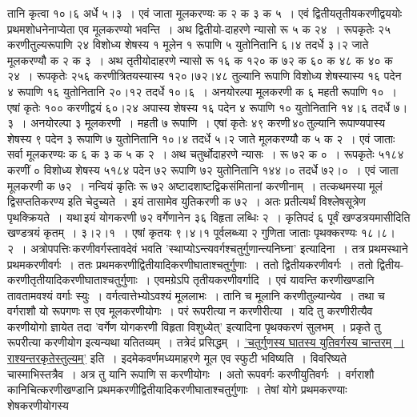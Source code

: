 \documentclass[11pt, openany]{book}
\begin{document}
\newpage

\begin{sloppypar}
\noindent तानि कृत्वा १०।६ अर्धे ५।३~। एवं जाता मूलकरण्यः क २ क ३ क ५~। एवं द्वितीयतृतीयकरणीद्वययोः प्रथमशोधनेनाप्येता एव मूलकरण्यो भवन्ति~। अथ द्वितीयो-दाहरणे न्यासो रू ५ क २४~। रूपकृतेः २५ करणीतुल्यरूपाणि २४ विशोध्य शेषस्य १ मूलेन १ रूपाणि ५ युतोनितानि ६।४ तदर्धे ३।२ जाते मूलकरण्यौ क २ क ३~। अथ तृतीयोदाहरणे न्यासो रू १६ क १२० क ७२ क ६० क ४८ क ४० क २४~। रूपकृतेः २५६ करणीत्रितयस्यास्य १२०।७२।४८ तुल्यानि रूपाणि विशोध्य शेषस्यास्य १६ पदेन ४ रूपाणि १६ युतोनितानि २०।१२ तदर्धे १०।६~। अनयोरल्पा मूलकरणी क ६ महती रूपाणि १०~। एषां कृतेः १०० करणीद्वयं ६०।२४ अपास्य शेषस्य १६ पदेन ४ रूपाणि १० युतोनितानि १४।६ तदर्धे ७।३~। अनयोरल्पा ३ मूलकरणी~। महती ७ रूपाणि~। एषां कृतेः ४९ करणी\textendash \,४०\textendash \,तुल्यानि रूपाण्यपास्य शेषस्य ९ पदेन ३ रूपाणि ७ युतोनितानि १०।४ तदर्धे ५।२ जाते मूलकरण्यौ क ५ क २~। एवं जाताः सर्वा मूलकरण्यः क ६ क ३ क ५ क २~। अथ चतुर्थोदाहरणे न्यासः~। रू ७२ क ०~। रूपकृतेः ५१८४ करणीं ० विशोध्य शेषस्य ५१८४ पदेन ७२ रूपाणि ७२ युतोनितानि १४४।० तदर्धे ७२।०~। एवं जाता मूलकरणी क ७२~। नन्वियं कृतिः रू ७२ अष्टादशाष्टद्विकसंमितानां करणीनाम्~। तत्कथमस्या मूलं द्विसप्ततिकरण्य इति चेदुच्यते~। इयं तासामेव युतिकरणी क ७२~। अतः प्रतीत्यर्थं विश्लेषसूत्रेण पृथक्क्रियते~। यथा\textendash \,इयं योगकरणी ७२ वर्गेणानेन ३६ विहृता लब्धिः २~। कृतिपदं ६ पूर्वं खण्डत्रयमासीदिति खण्डत्रयं कृतम्~। ३।२।१~। एषां कृतयः ९।४।१ पूर्वलब्ध्या २ गुणिता जाताः पृथक्करण्यः १८।८।२~। अत्रोपपत्तिः\textendash \,करणीवर्गस्तावदेवं भवति {\color{violet}'स्थाप्योऽन्त्यवर्गश्चतुर्गुणान्त्यनिघ्ना'} इत्यादिना~। तत्र प्रथमस्थाने प्रथमकरणीवर्गः~। ततः प्रथमकरणीद्वितीयादिकरणीघाताश्चतुर्गुणाः~। ततो द्वितीयकरणीवर्गः~। ततो द्वितीय-करणीतृतीयादिकरणीघाताश्चतुर्गुणाः~। एवमग्रेऽपि तृतीयकरणीवर्गादि~। एवं यावन्ति करणीखण्डानि तावतामवश्यं वर्गाः स्युः~। वर्गत्वात्तेभ्योऽवश्यं मूललाभः~। तानि च मूलानि करणीतुल्यान्येव~। तथा च वर्गराशौ यो रूपगणः स एव मूलकरणीयोगः~। परं रूपरीत्या न करणीरीत्या~। यदि तु करणीरीत्यैव करणीयोगो ज्ञायेत तदा {\color{violet}'वर्गेण योगकरणी विहृता विशुध्येत्'} इत्यादिना पृथक्करणं सुलभम्~। प्रकृते तु रूपरीत्या करणीयोग इत्यन्यथा यतितव्यम्~। तत्रेदं प्रसिद्धम्~। \hyperref[8.131]{'चतुर्गुणस्य घातस्य युतिवर्गस्य चान्तरम्~। राश्यन्तरकृतेस्तुल्यम्'} इति~। इदमेकवर्णमध्यमाहरणे मूल एव स्फुटी भविष्यति~। विवरिष्यते चास्माभिस्तत्रैव~। अत्र तु यानि रूपाणि स करणीयोगः~। अतो रूपवर्गः करणीयुतिवर्गः~। वर्गराशौ कानिचित्करणीखण्डानि प्रथमकरणीद्वितीयादिकरणीघाताश्चतुर्गुणाः~। तेषां योगे प्रथमकरण्याः शेषकरणीयोगस्य
\end{sloppypar}

\newpage
\end{document}
